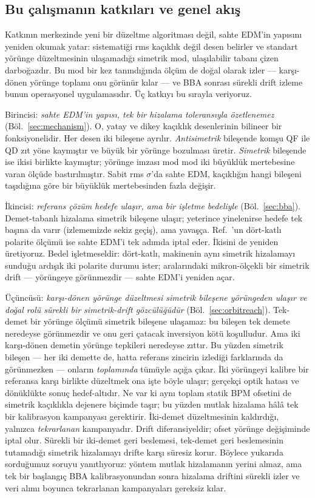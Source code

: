 \documentclass[aps,prab,reprint,superscriptaddress,nofootinbib]{revtex4-2}
\begin{document}
\subsection{Bu çalışmanın katkıları ve genel akış}
\label{sec:outline}

Katkının merkezinde yeni bir düzeltme algoritması değil, sahte EDM'in yapısını
yeniden okumak yatar: sistematiği rms kaçıklık değil desen belirler ve standart
yörünge düzeltmesinin ulaşamadığı simetrik mod, ulaşılabilir tabanı çizen
darboğazdır. Bu mod bir kez tanındığında ölçüm de doğal olarak izler --- karşı-dönen
yörünge toplamı onu görünür kılar --- ve BBA sonrası sürekli drift izleme bunun
operasyonel uygulamasıdır. Üç katkıyı bu sırayla veriyoruz.

Birincisi: \emph{sahte EDM'in yapısı, tek bir hizalama toleransıyla özetlenemez}
(Böl.~\ref{sec:mechanism}). O, yatay ve dikey kaçıklık desenlerinin bilineer bir
fonksiyonelidir. Her desen iki bileşene ayrılır. \emph{Antisimetrik} bileşende komşu
QF ile QD zıt yöne kaymıştır ve büyük bir yörünge bozulması üretir. \emph{Simetrik}
bileşende ise ikisi birlikte kaymıştır; yörünge imzası mod mod iki büyüklük
mertebesine varan ölçüde bastırılmıştır. Sabit rms $\sigma$'da sahte EDM, kaçıklığın
hangi bileşeni taşıdığına göre bir büyüklük mertebesinden fazla değişir.

İkincisi: \emph{referans çözüm hedefe ulaşır, ama bir işletme bedeliyle}
(Böl.~\ref{sec:bba}). Demet-tabanlı hizalama simetrik bileşene ulaşır; yeterince
yinelenirse hedefe tek başına da varır (izlememizde sekiz geçiş), ama yavaşça.
Ref.~\cite{omarov}'un dört-katlı polarite ölçümü ise sahte EDM'i tek adımda iptal
eder. İkisini de yeniden üretiyoruz. Bedel işletmeseldir: dört-katlı, makinenin aynı
simetrik hizalamayı sunduğu ardışık iki polarite durumu ister; aralarındaki
mikron-ölçekli bir simetrik drift --- yörüngeye görünmezdir --- sahte EDM'i yeniden
açar.

Üçüncüsü: \emph{karşı-dönen yörünge düzeltmesi simetrik bileşene yörüngeden ulaşır
ve doğal rolü sürekli bir simetrik-drift gözcülüğüdür} (Böl.~\ref{sec:orbitreach}).
Tek-demet bir yörünge ölçümü simetrik bileşene ulaşamaz: bu bileşen tek demete
neredeyse görünmezdir ve onu geri çatacak inversiyon kötü koşulludur. Ama iki
karşı-dönen demetin yörünge tepkileri neredeyse zıttır. Bu yüzden simetrik bileşen
--- her iki demette de, hatta referans zincirin izlediği farklarında da görünmezken
--- onların \emph{toplamında} tümüyle açığa çıkar. İki yörüngeyi kalibre bir
referansa karşı birlikte düzeltmek ona işte böyle ulaşır; gerçekçi optik hatası ve
dönüklükte sonuç hedef-altıdır. Ne var ki aynı toplam statik BPM ofsetini de
simetrik kaçıklıkla dejenere biçimde taşır; bu yüzden mutlak hizalama hâlâ tek bir
kalibrasyon kampanyası gerektirir. İki-demet düzeltmesinin kaldırdığı, yalnızca
\emph{tekrarlanan} kampanyadır. Drift diferansiyeldir; ofset yörünge değişiminde
iptal olur. Sürekli bir iki-demet geri beslemesi, tek-demet geri beslemesinin
tutamadığı simetrik hizalamayı drifte karşı süresiz korur. Böylece yukarıda
sorduğumuz soruyu yanıtlıyoruz: yöntem mutlak hizalamanın yerini almaz, ama tek bir
başlangıç BBA kalibrasyonundan sonra hizalama driftini sürekli izler ve veri alımı
boyunca tekrarlanan kampanyaları gereksiz kılar.
\end{document}
